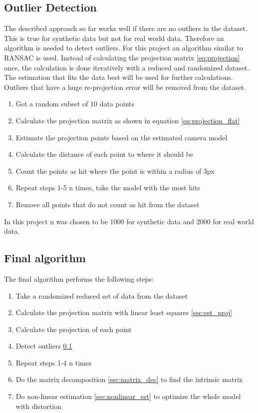 \documentclass[11pt,a4paper,titlepage,oneside]{report}
\begin{document}
\subsection{Outlier Detection}\label{sec:outliers}
The described approach so far works well if there are no outliers in the dataset. This is true for synthetic data but not for real world data. Therefore an algorithm is needed to detect outliers. For this project an algorithm similar to RANSAC \cite{ransac} is used. Instead of calculating the projection matrix \ref{eq:projection} once, the calculation is done iteratively with a reduced and randomized dataset. The estimation that fits the data best will be used for further calculations. Outliers that have a huge re-projection error will be removed from the dataset.
\begin{enumerate}
	\item Get a random subset of 10 data points
	\item Calculate the projection matrix as shown in equation \ref{eq:projection_flat}
	\item Estimate the projection points based on the estimated camera model
	\item Calculate the distance of each point to where it should be
	\item Count the points as hit where the point is within a radius of 3px
	\item Repeat steps 1-5 n times, take the model with the most hits
	\item Remove all points that do not count as hit from the dataset
\end{enumerate}

In this project n was chosen to be 1000 for synthetic data and 2000 for real world data.

\subsection{Final algorithm}
The final algorithm performs the following steps:
\begin{enumerate}
	\item Take a randomized reduced set of data from the dataset
	\item Calculate the projection matrix with linear least squares \ref{sec:est_proj}
	\item Calculate the projection of each point
	\item Detect outliers \ref{sec:outliers}
	\item Repeat steps 1-4 n times
	\item Do the matrix decomposition \ref{sec:matrix_dec} to find the intrinsic matrix
	\item Do non-linear estimation \ref{sec:nonlinear_est} to optimize the whole model with distortion
\end{enumerate}
\end{document}
